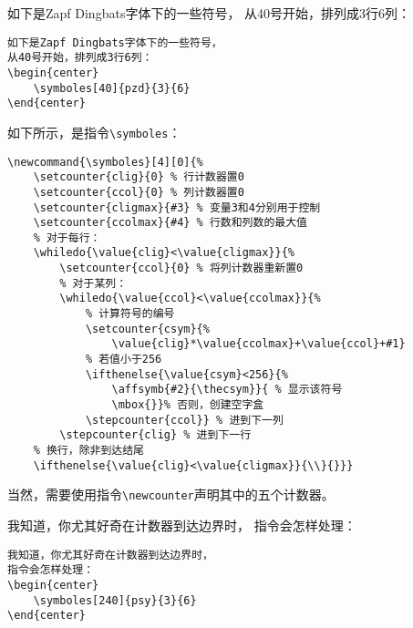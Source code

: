 \begin{codelist}[9.11]{
如下是Zapf Dingbats字体下的一些符号，
从40号开始，排列成3行6列：
\begin{center}
\end{center}
}\begin{verbatim}
如下是Zapf Dingbats字体下的一些符号，
从40号开始，排列成3行6列：
\begin{center}
    \symboles[40]{pzd}{3}{6}
\end{center}
\end{verbatim}
\end{codelist}

如下所示，是指令\verb|\symboles|：

\begin{dmd}
\begin{verbatim}
\newcommand{\symboles}[4][0]{%
    \setcounter{clig}{0} % 行计数器置0
    \setcounter{ccol}{0} % 列计数器置0
    \setcounter{cligmax}{#3} % 变量3和4分别用于控制
    \setcounter{ccolmax}{#4} % 行数和列数的最大值
    % 对于每行：
    \whiledo{\value{clig}<\value{cligmax}}{%
        \setcounter{ccol}{0} % 将列计数器重新置0
        % 对于某列： 
        \whiledo{\value{ccol}<\value{ccolmax}}{%
            % 计算符号的编号
            \setcounter{csym}{%
                \value{clig}*\value{ccolmax}+\value{ccol}+#1}
            % 若值小于256 
            \ifthenelse{\value{csym}<256}{%
                \affsymb{#2}{\thecsym}}{ % 显示该符号
                \mbox{}}% 否则，创建空字盒
            \stepcounter{ccol}} % 进到下一列
        \stepcounter{clig} % 进到下一行
    % 换行，除非到达结尾
    \ifthenelse{\value{clig}<\value{cligmax}}{\\}{}}}
\end{verbatim}
\end{dmd}

当然，需要使用指令\verb|\newcounter|声明其中的五个计数器。

\begin{codelist}[9.12]{
    我知道，你尤其好奇在计数器到达边界时，
    指令会怎样处理：
\begin{center}
\end{center}
}\begin{verbatim}
我知道，你尤其好奇在计数器到达边界时，
指令会怎样处理：
\begin{center}
    \symboles[240]{psy}{3}{6}
\end{center}
\end{verbatim}
\end{codelist}

